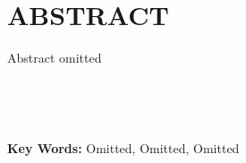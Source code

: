 \section*{\textbf{}ABSTRACT}

Abstract omitted

~

~

\noindent\textbf{Key Words: }Omitted, Omitted, Omitted

